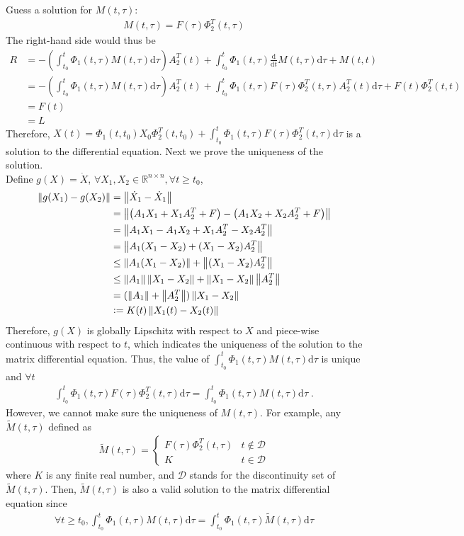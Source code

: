 \documentclass[a4paper,10.5pt]{article}
\newcommand{\de}{\mathrm{d}}
\newcommand{\R}{\mathbb{R}}
\newcommand{\defeq}{\vcentcolon=}
\newcommand{\norm}[1]{\left\lVert#1\right\rVert}
\begin{document}
Guess a solution for $M(t,\tau)$:
\begin{align*}
M(t,\tau) = F(\tau)\Phi_2^T(t,\tau)
\end{align*}
The right-hand side would thus be
\begin{align*}
R &= -\left( \int_{t_0}^{t}\Phi_1(t,\tau)M(t,\tau)\de\tau \right) A_2^T(t)+\int_{t_0}^t \Phi_1(t,\tau)\frac{\de}{\de t}M(t,\tau)\de \tau + M(t,t) \\
&= -\left( \int_{t_0}^{t}\Phi_1(t,\tau)M(t,\tau)\de\tau \right) A_2^T(t)+\int_{t_0}^t \Phi_1(t,\tau)F(\tau)\Phi_2^T(t,\tau)A_2^T(t)\de \tau + F(t)\Phi_2^T(t,t) \\
&= F(t) \\
&= L
\end{align*}
Therefore, $X(t) = \Phi_1(t,t_0) X_0 \Phi^T_2(t,t_0) + \int_{t_0}^{t}\Phi_1(t,\tau)F(\tau)\Phi_2^T(t,\tau)\mathrm{d}\tau$ is a solution to the differential equation. Next we prove the uniqueness of the solution. \\

Define $g(X) = \dot{X}$, $\forall X_1,X_2 \in \R^{n \times n}, \forall t \geq t_0$,
\begin{align*}
\norm{g(X_1)-g(X_2)} &= \norm{\dot{X}_1-\dot{X}_1} \\
&=\norm{\left(A_1X_1 + X_1 A^T_2 + F\right)-\left(A_1X_2 + X_2 A^T_2 + F\right)} \\
&=\norm{A_1X_1-A_1X_2+ X_1 A^T_2- X_2A^T_2} \\
&=\norm{A_1(X_1-X_2)+ (X_1-X_2)A^T_2} \\
&\leq \norm{A_1(X_1-X_2)} + \norm{(X_1-X_2)A^T_2} \\
&\leq \norm{A_1}\norm{X_1-X_2} + \norm{X_1-X_2}\norm{A^T_2} \\
&= (\norm{A_1}+\norm{A_2^T})\norm{X_1-X_2} \\
&\defeq K(t)\norm{X_1(t)-X_2(t)}
\end{align*}
Therefore, $g(X)$ is globally Lipschitz with respect to $X$ and piece-wise continuous with respect to $t$, which indicates the uniqueness of the solution to the matrix differential equation. Thus, the value of $\int_{t_0}^{t}\Phi_1(t,\tau)M(t,\tau)\de\tau$ is unique and $\forall t$
\begin{align*}
\int_{t_0}^{t}\Phi_1(t,\tau)F(\tau)\Phi_2^T(t,\tau)\mathrm{d}\tau = \int_{t_0}^{t}\Phi_1(t,\tau)M(t,\tau)\de\tau \; .
\end{align*}
However, we cannot make sure the uniqueness of $M(t,\tau)$. For example, any $\tilde{M}(t,\tau)$ defined as
\begin{align*}
\tilde{M}(t,\tau) = \begin{cases}
F(\tau)\Phi_2^T(t,\tau) & t \notin \mathcal{D} \\
K & t \in \mathcal{D}
\end{cases}
\end{align*}
where $K$ is any finite real number, and $\mathcal{D}$ stands for the discontinuity set of $\tilde{M}(t,\tau)$. Then, $\tilde{M}(t,\tau)$ is also a valid solution to the matrix differential equation since
\begin{align*}
\forall t \geq t_0, \int_{t_0}^{t}\Phi_1(t,\tau)M(t,\tau)\de\tau =  \int_{t_0}^{t}\Phi_1(t,\tau)\tilde{M}(t,\tau)\de\tau
\end{align*}
\end{document}
